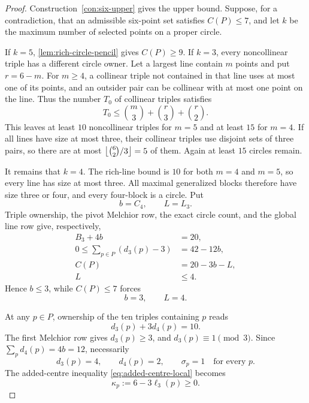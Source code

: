 \begin{proof}
Construction~\ref{con:six-upper} gives the upper bound.  Suppose, for a
contradiction, that an admissible six-point set satisfies $C(P)\leq7$, and
let $k$ be the maximum number of selected points on a proper circle.

If $k=5$, \cref{lem:rich-circle-pencil} gives $C(P)\geq9$.  If $k=3$,
every noncollinear triple has a different circle owner.  Let a largest line
contain $m$ points and put $r=6-m$.  For $m\geq4$, a collinear triple not
contained in that line uses at most one of its points, and an outsider pair
can be collinear with at most one point on the line.  Thus the number $T_0$
of collinear triples satisfies
\[
 T_0\leq\binom m3+\binom r3+\binom r2.
\]
This leaves at least $10$ noncollinear triples for $m=5$ and at least $15$
for $m=4$.  If all lines have size at most three, their collinear triples use
disjoint sets of three pairs, so there are at most
$\left\lfloor \binom62/3\right\rfloor=5$ of them.  Again at least $15$ circles remain.

It remains that $k=4$.  The rich-line bound is $10$ for both $m=4$ and
$m=5$, so every line has size at most three.  All maximal generalized blocks
therefore have size three or four, and every four-block is a circle.  Put
\[
 b=C_4,\qquad L=L_3.
\]
Triple ownership, the pivot Melchior row, the exact circle count, and the
global line row give, respectively,
\begin{align}
 B_3+4b&=20,                                      \label{eq:n6-triples}\\
 0\leq\sum_{p\in P}(d_3(p)-3)&=42-12b,           \label{eq:n6-pivot}\\
 C(P)&=20-3b-L,                                   \label{eq:n6-circles}\\
 L&\leq4.                                         \label{eq:n6-lines}
\end{align}
Hence $b\leq3$, while $C(P)\leq7$ forces
\begin{equation}\label{eq:n6-terminal-rows}
 b=3,\qquad L=4.
\end{equation}

At any $p\in P$, ownership of the ten triples containing $p$ reads
\[
 d_3(p)+3d_4(p)=10.
\]
The first Melchior row gives $d_3(p)\geq3$, and $d_3(p)\equiv1\pmod3$.
Since $\sum_p d_4(p)=4b=12$, necessarily
\begin{equation}\label{eq:n6-local-profile}
 d_3(p)=4,\qquad d_4(p)=2,\qquad \sigma_p=1
 \quad\text{for every }p.
\end{equation}
The added-centre inequality \eqref{eq:added-centre-local} becomes
\begin{equation}\label{eq:n6-kappa}
 \kappa_p:=6-3\ell_3(p)\geq0.
\end{equation}


\end{proof}
